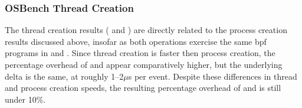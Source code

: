 

\subsubsection{OSBench Thread Creation}

The thread creation results ( and ) are directly related to the
process creation results discussed above, insofar as both operations exercise the same
\gls{bpf} programs in \bpfbox{} and \bpfcontain{}. Since thread creation is faster then
process creation, the percentage overhead of \bpfbox{} and \bpfcontain{} appear
comparatively higher, but the underlying delta is the same, at roughly 1--2$\mu$s per
event. Despite these differences in thread and process creation speeds, the resulting
percentage overhead of \bpfbox{} and \bpfcontain{} is still under 10\%.

